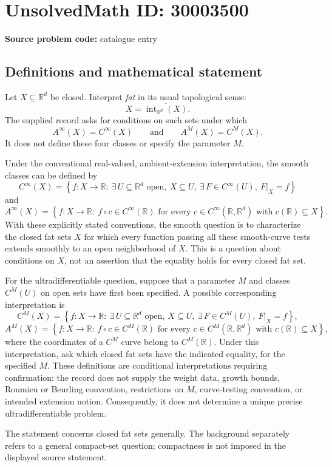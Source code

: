 \documentclass[11pt]{article}
\newcommand{\R}{\mathbb{R}}
\begin{document}
\section*{UnsolvedMath ID: 30003500}
\textbf{Source problem code:} catalogue entry
\subsection{Definitions and mathematical statement}
Let \(X\subseteq\R^d\) be closed. Interpret \emph{fat} in its usual topological sense:
\[
X=\overline{\operatorname{int}_{\R^d}(X)}.
\]
The supplied record asks for conditions on such sets under which
\[
A^\infty(X)=C^\infty(X)
\qquad\text{and}\qquad
A^M(X)=C^M(X).
\]
It does not define these four classes or specify the parameter \(M\).

Under the conventional real-valued, ambient-extension interpretation, the smooth classes can be defined by
\[
C^\infty(X)=\left\{f:X\to\R:\ \exists\,U\subseteq\R^d\text{ open},\ X\subseteq U,\ \exists\,F\in C^\infty(U),\ F|_X=f\right\}
\]
and
\[
A^\infty(X)=\left\{f:X\to\R:\ f\circ c\in C^\infty(\R)\text{ for every }c\in C^\infty(\R,\R^d)\text{ with }c(\R)\subseteq X\right\}.
\]
With these explicitly stated conventions, the smooth question is to characterize the closed fat sets \(X\) for which every function passing all these smooth-curve tests extends smoothly to an open neighborhood of \(X\). This is a question about conditions on \(X\), not an assertion that the equality holds for every closed fat set.

For the ultradifferentiable question, suppose that a parameter \(M\) and classes \(C^M(U)\) on open sets have first been specified. A possible corresponding interpretation is
\[
C^M(X)=\left\{f:X\to\R:\ \exists\,U\subseteq\R^d\text{ open},\ X\subseteq U,\ \exists\,F\in C^M(U),\ F|_X=f\right\},
\]
\[
A^M(X)=\left\{f:X\to\R:\ f\circ c\in C^M(\R)\text{ for every }c\in C^M(\R,\R^d)\text{ with }c(\R)\subseteq X\right\},
\]
where the coordinates of a \(C^M\) curve belong to \(C^M(\R)\). Under this interpretation, ask which closed fat sets have the indicated equality, for the specified \(M\). These definitions are conditional interpretations requiring confirmation: the record does not supply the weight data, growth bounds, Roumieu or Beurling convention, restrictions on \(M\), curve-testing convention, or intended extension notion. Consequently, it does not determine a unique precise ultradifferentiable problem.

The statement concerns closed fat sets generally. The background separately refers to a general compact-set question; compactness is not imposed in the displayed source statement.
\end{document}
